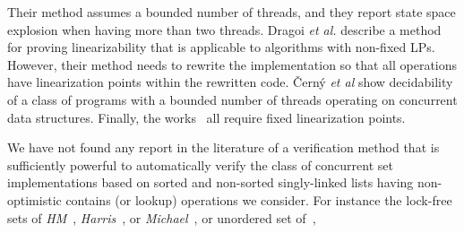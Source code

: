 Their method assumes a bounded number of threads, and
they report state space explosion when having more than two threads.
%
Dragoi  {\it et al.} \cite{Henzinger:CAV13} describe a method for proving
linearizability that is applicable to algorithms with non-fixed LPs.
%
However, their method needs to rewrite the implementation so that all operations 
have linearization points within the rewritten code.
%
\v{C}ern{\'y} {\it et al} \cite{CernyRZCA:CAV10} show decidability of a class
of programs with a bounded number of threads operating on concurrent data structures.
%
%
Finally, the works~\cite{AHHR:integrated,BLMRS:cav08,Vafeiadis:vmcai09}
all require fixed linearization points.

We have not found any report in the literature of a
verification method that is sufficiently powerful to
automatically verify the class of concurrent set
implementations based on sorted and non-sorted
singly-linked lists having non-optimistic contains (or lookup) operations we consider. For instance %
the lock-free sets of {\it HM}~\cite{ArtOfMpP},
{\it Harris}~\cite{Harris:list}, or {\it Michael}~\cite{Michael:list},
or unordered set of~\cite{Zhang:unorderedlist},



